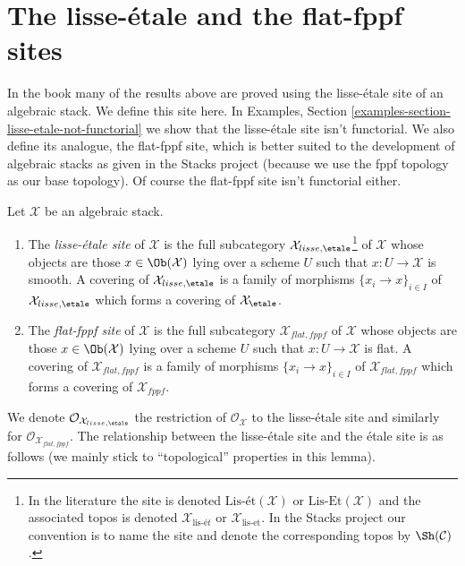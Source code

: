 \section{The lisse-\'etale and the flat-fppf sites}
\label{section-lisse-etale}

\noindent
In the book \cite{LM-B} many of the results above are proved using the
lisse-\'etale site of an algebraic stack. We define this site here.
In Examples, Section \ref{examples-section-lisse-etale-not-functorial}
we show that the lisse-\'etale site isn't functorial.
We also define its analogue, the flat-fppf site, which is better suited
to the development of algebraic stacks as given in the Stacks project
(because we use the fppf topology as our base topology). Of course the
flat-fppf site isn't functorial either.

\begin{definition}
\label{definition-lisse-etale}
Let $\mathcal{X}$ be an algebraic stack.
\begin{enumerate}
\item The {\it lisse-\'etale site} of $\mathcal{X}$ is the full subcategory
$\mathcal{X}_{lisse,\etale}$\footnote{In the literature the
site is denoted $\text{Lis-\'et}(\mathcal{X})$ or
$\text{Lis-Et}(\mathcal{X})$ and the associated topos is denoted
$\mathcal{X}_{\text{lis-\'e}t}$ or $\mathcal{X}_{\text{lis-et}}$.
In the Stacks project our convention is to name the site and
denote the corresponding topos by $\Sh(\mathcal{C})$.} of $\mathcal{X}$
whose objects are those $x \in \Ob(\mathcal{X})$ lying over a scheme $U$
such that $x : U \to \mathcal{X}$ is smooth. A covering of
$\mathcal{X}_{lisse,\etale}$ is a family of morphisms
$\{x_i \to x\}_{i \in I}$ of $\mathcal{X}_{lisse,\etale}$
which forms a covering of $\mathcal{X}_\etale$.
\item The {\it flat-fppf site} of $\mathcal{X}$ is the full subcategory
$\mathcal{X}_{flat,fppf}$ of $\mathcal{X}$
whose objects are those $x \in \Ob(\mathcal{X})$ lying over a scheme $U$
such that $x : U \to \mathcal{X}$ is flat. A covering of
$\mathcal{X}_{flat,fppf}$ is a family of morphisms
$\{x_i \to x\}_{i \in I}$ of $\mathcal{X}_{flat,fppf}$
which forms a covering of $\mathcal{X}_{fppf}$.
\end{enumerate}
\end{definition}

\noindent
We denote $\mathcal{O}_{\mathcal{X}_{lisse,\etale}}$
the restriction of $\mathcal{O}_\mathcal{X}$ to the lisse-\'etale site
and similarly for $\mathcal{O}_{\mathcal{X}_{flat,fppf}}$.
The relationship between the lisse-\'etale site and the \'etale site is
as follows (we mainly stick to ``topological'' properties in this lemma).

